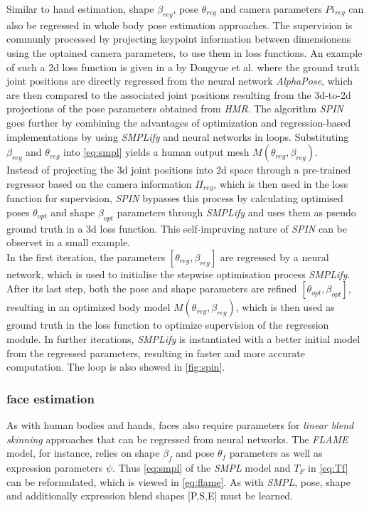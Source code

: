 Similar to hand estimation, shape $\beta_{reg}$, pose $\theta_{reg}$ and camera parameters $Pi_{reg}$ can also be regressed in whole body pose estimation approaches. The supervision is communly processed by projecting keypoint information between dimensionens using the optained camera parameters, to use them in loss functions. An example of such a 2d loss function is given in \cite{chen} a by Dongyue et al. where the ground truth joint positions are directly regressed from the neural network \emph{AlphaPose}, which are then compared to the associated joint positions resulting from the 3d-to-2d projections of the pose parameters obtained from \emph{HMR}. The algorithm \emph{SPIN} \cite{spin} goes further by combining the advantages of optimization and regression-based implementations by using \emph{SMPLify} and neural networks in loops. Substituting $\beta_{reg}$ and $\theta_{reg}$ into \autoref{eq:smpl} yields a human output mesh $M(\theta_{reg},\beta_{reg})$. \\ 
Instead of projecting the 3d joint positions into 2d space through a pre-trained regressor based on the camera information $\Pi_{reg}$, which is then used in the loss function for supervision, \emph{SPIN} bypasses this process by calculating optimised poses $\theta_{opt}$ and shape $\beta_{opt}$ parameters through \emph{SMPLify} and uses them as pseudo ground truth in a 3d loss function. This self-impruving nature of \emph{SPIN} can be observet in a small example. \\
In the first iteration, the parameters $[\theta_{reg},\beta_{reg}]$ are regressed by a neural network, which is used to initialise the stepwise optimisation process \emph{SMPLify}. After its last step, both the pose and shape parameters are refined $[\theta_{opt},\beta_{opt}]$, resulting in an optimized body model $M(\theta_{reg},\beta_{reg})$, which is then used as ground truth in the loss function to optimize supervision of the regression module. In further iterations, \emph{SMPLify} is instantiated with a better initial model from the regressed parameters, resulting in faster and more accurate computation. The loop is also showed in \autoref{fig:spin}.

 

\subsubsection{face estimation}
As with human bodies and hands, faces also require parameters for \emph{linear blend skinning} approaches that can be regressed from neural networks. The \emph{FLAME} model, for instance, relies on shape $\beta_{f}$ and pose $\theta_{f}$ parameters as well as expression parameters  $\psi$. Thus \autoref{eq:smpl} of the \emph{SMPL} model and $T_{F}$ in \autoref{eq:Tf} can be reformulated, which is viewed in \autoref{eq:flame}. As with \emph{SMPL}, pose, shape and additionally expression blend shapes [P,S,E] must be learned. \cite{flame}

